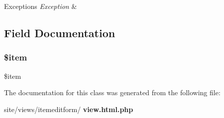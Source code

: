\begin{DoxyExceptions}{Exceptions}
{\em Exception} & \\
\hline
\end{DoxyExceptions}


\subsection{Field Documentation}
\mbox{\label{classtks__agenda_view_itemeditform_aa61b415cee119a7511e05c405ecd0b32}} 
\subsubsection{\$item}
{\footnotesize\ttfamily \$item\hspace{0.3cm}{\ttfamily [protected]}}



The documentation for this class was generated from the following file\+:\begin{DoxyCompactItemize}
\item 
site/views/itemeditform/\textbf{ view.\+html.\+php}\end{DoxyCompactItemize}
